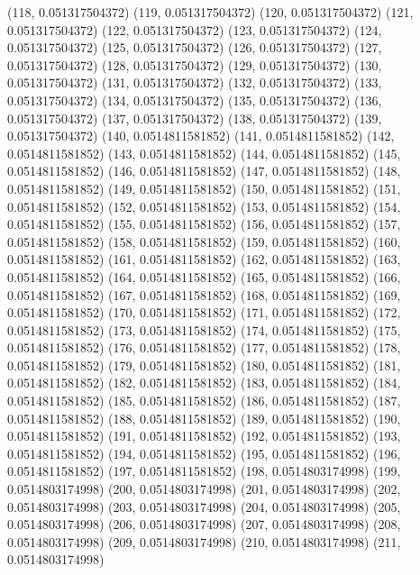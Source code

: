 {					(118, 0.051317504372)
					(119, 0.051317504372)
					(120, 0.051317504372)
					(121, 0.051317504372)
					(122, 0.051317504372)
					(123, 0.051317504372)
					(124, 0.051317504372)
					(125, 0.051317504372)
					(126, 0.051317504372)
					(127, 0.051317504372)
					(128, 0.051317504372)
					(129, 0.051317504372)
					(130, 0.051317504372)
					(131, 0.051317504372)
					(132, 0.051317504372)
					(133, 0.051317504372)
					(134, 0.051317504372)
					(135, 0.051317504372)
					(136, 0.051317504372)
					(137, 0.051317504372)
					(138, 0.051317504372)
					(139, 0.051317504372)
					(140, 0.0514811581852)
					(141, 0.0514811581852)
					(142, 0.0514811581852)
					(143, 0.0514811581852)
					(144, 0.0514811581852)
					(145, 0.0514811581852)
					(146, 0.0514811581852)
					(147, 0.0514811581852)
					(148, 0.0514811581852)
					(149, 0.0514811581852)
					(150, 0.0514811581852)
					(151, 0.0514811581852)
					(152, 0.0514811581852)
					(153, 0.0514811581852)
					(154, 0.0514811581852)
					(155, 0.0514811581852)
					(156, 0.0514811581852)
					(157, 0.0514811581852)
					(158, 0.0514811581852)
					(159, 0.0514811581852)
					(160, 0.0514811581852)
					(161, 0.0514811581852)
					(162, 0.0514811581852)
					(163, 0.0514811581852)
					(164, 0.0514811581852)
					(165, 0.0514811581852)
					(166, 0.0514811581852)
					(167, 0.0514811581852)
					(168, 0.0514811581852)
					(169, 0.0514811581852)
					(170, 0.0514811581852)
					(171, 0.0514811581852)
					(172, 0.0514811581852)
					(173, 0.0514811581852)
					(174, 0.0514811581852)
					(175, 0.0514811581852)
					(176, 0.0514811581852)
					(177, 0.0514811581852)
					(178, 0.0514811581852)
					(179, 0.0514811581852)
					(180, 0.0514811581852)
					(181, 0.0514811581852)
					(182, 0.0514811581852)
					(183, 0.0514811581852)
					(184, 0.0514811581852)
					(185, 0.0514811581852)
					(186, 0.0514811581852)
					(187, 0.0514811581852)
					(188, 0.0514811581852)
					(189, 0.0514811581852)
					(190, 0.0514811581852)
					(191, 0.0514811581852)
					(192, 0.0514811581852)
					(193, 0.0514811581852)
					(194, 0.0514811581852)
					(195, 0.0514811581852)
					(196, 0.0514811581852)
					(197, 0.0514811581852)
					(198, 0.0514803174998)
					(199, 0.0514803174998)
					(200, 0.0514803174998)
					(201, 0.0514803174998)
					(202, 0.0514803174998)
					(203, 0.0514803174998)
					(204, 0.0514803174998)
					(205, 0.0514803174998)
					(206, 0.0514803174998)
					(207, 0.0514803174998)
					(208, 0.0514803174998)
					(209, 0.0514803174998)
					(210, 0.0514803174998)
					(211, 0.0514803174998)
}
